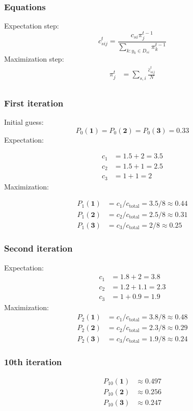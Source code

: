 \subsubsection*{Equations}
Expectation step:
\begin{equation*}
\hat c^t_{sij} = \frac{c_{si}\pi^{t-1}_{j}}{\sum_{k: y_k \in D_{si}}\pi^{t-1}_{k}}
\end{equation*}
Maximization step:
\begin{equation*}
\begin{split}
\pi^t_j &= \sum_{s,i}\frac{\hat c^t_{sij}}
{N}\\
\end{split}
\end{equation*}
\subsubsection*{First iteration}
Initial guess:    
\begin{equation*}
P_0(\mathbf{1}) =  P_0(\mathbf{2}) =  P_0(\mathbf{3}) = 0.33
\end{equation*}
Expectation: 

\begin{align*}
    c_1 &= 1.5 + 2 = 3.5 \\ 
    c_2 &= 1.5 + 1 = 2.5 \\
    c_3 &= 1 + 1 = 2
\end{align*}
Maximization: 

\begin{align*}
    P_1 (\mathbf{1}) &= c_1/c_{\text{total}} = 3.5/8    \approx 0.44 \\
    P_1 (\mathbf{2}) &= c_2/c_{\text{total}} = 2.5/8 \approx 0.31 \\
    P_1 (\mathbf{3}) &= c_3/c_{\text{total}} = 2/8   \approx 0.25
\end{align*}

\subsubsection*{Second iteration} 
Expectation: 
\begin{align*}
    c_1 &= 1.8 + 2 = 3.8 \\ 
    c_2 &= 1.2 + 1.1 = 2.3 \\
    c_3 &= 1 + 0.9 = 1.9
\end{align*}
Maximization:
\begin{align*}
    P_2 (\mathbf{1}) &= c_1/c_{\text{total}} = 3.8/8 \approx 0.48 \\
    P_2 (\mathbf{2}) &= c_2/c_{\text{total}} = 2.3/8 \approx 0.29 \\
    P_2 (\mathbf{3}) &= c_3/c_{\text{total}} = 1.9/8 \approx 0.24
\end{align*}

\subsubsection*{10th iteration}
\begin{align*}
    P_{10} (\mathbf{1}) & \approx 0.497 \\
    P_{10} (\mathbf{2}) & \approx 0.256 \\
    P_{10} (\mathbf{3}) & \approx 0.247
\end{align*}